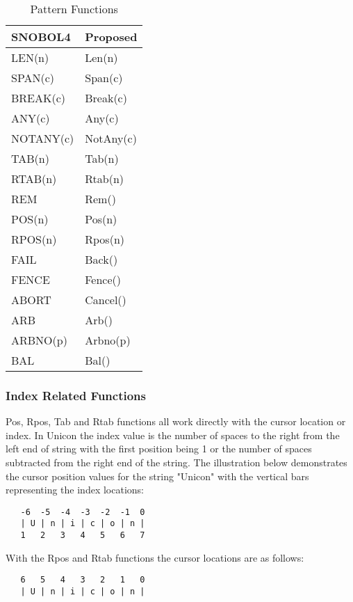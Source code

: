 \documentclass{article}
\begin{document}
\begin{table}[ht]
	\caption{Pattern Functions}
	\centering
	\begin{tabular}{|l|l|}
		\hline\hline
		SNOBOL4 & Proposed \\
		\hline
		LEN(n) & Len(n) \\
		SPAN(c) & Span(c)  \\
		BREAK(c) & Break(c) \\
		ANY(c) & Any(c) \\
		NOTANY(c) & NotAny(c) \\
		TAB(n) & Tab(n) \\
		RTAB(n) & Rtab(n) \\
		REM & Rem() \\
		POS(n) & Pos(n)  \\
		RPOS(n) & Rpos(n)  \\
		FAIL & Back() \\
		FENCE & Fence() \\
		ABORT & Cancel() \\
		ARB & Arb() \\
		ARBNO(p) & Arbno(p) \\
		BAL & Bal() \\
		\hline
	\end{tabular}
\end{table}

\pagebreak
\vspace{2 pc}
\subsubsection{Index Related Functions}
Pos, Rpos, Tab and Rtab functions all work directly with the cursor location or index.  In Unicon the index value is the number of spaces to the right from the left end of string with the first position being 1 or the number of spaces subtracted from the right end of the string.\cite{JefferyUnicon}   The illustration below demonstrates the cursor position values for the string "Unicon" with the vertical bars representing the index locations:

\begin{verbatim}
   -6  -5  -4  -3  -2  -1  0
   | U | n | i | c | o | n |
   1   2   3   4   5   6   7
\end{verbatim}

With the Rpos and Rtab functions the cursor locations are as follows:

\begin{verbatim}
   6   5   4   3   2   1   0
   | U | n | i | c | o | n |
\end{verbatim}
\end{document}
